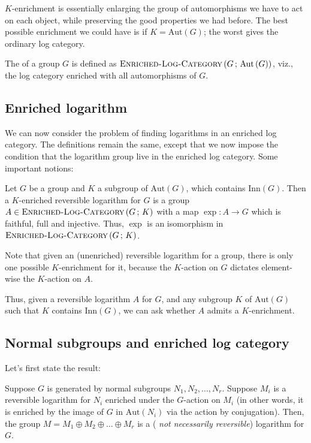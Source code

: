 \documentclass[a4paper]{amsart}
\newcommand{\enrichedlogcategory}[2]{\textsc{Enriched-Log-Category}\left(#1 \, ; \, #2\right)}
\newcommand{\aut}[1]{\text{Aut}\left(#1\right)}
\newcommand{\inn}[1]{\text{Inn}\left(#1\right)}
\begin{document}
$K$-enrichment is essentially enlarging the group of automorphisms we
have to act on each object, while preserving the good properties we
had before. The best possible enrichment we could have is if $K = \aut{G}$;
the worst gives the ordinary log category.

\begin{definer}
  The  of a group $G$ is
  defined as $\enrichedlogcategory{G}{\aut{G}}$, viz., the log
  category enriched with all automorphisms of $G$.
\end{definer}

\subsection{Enriched logarithm}

We can now consider the problem of finding logarithms in an enriched
log category. The definitions remain the same, except that we now
impose the condition that the logarithm group live in the enriched log
category. Some important notions:

\begin{definer}
  Let $G$ be a group and $K$ a subgroup of $\aut{G}$, which contains
  $\inn{G}$. Then a $K$-enriched reversible logarithm for $G$ is a
  group $A \in \enrichedlogcategory{G}{K}$ with a map $\exp:A \to G$
  which is faithful, full and injective. Thus, $\exp$ is an
  isomorphism in $\enrichedlogcategory{G}{K}$.
\end{definer}

Note that given an (unenriched) reversible logarithm for a group,
there is only one possible $K$-enrichment for it, because the
$K$-action on $G$ dictates element-wise the $K$-action on $A$.

Thus, given a reversible logarithm $A$ for $G$, and any subgroup $K$
of $\aut{G}$ such that $K$ contains $\inn{G}$, we can ask whether $A$
admits a $K$-enrichment.

\subsection{Normal subgroups and enriched log category}

Let's first state the result:

\begin{theorem}
  Suppose $G$ is generated by normal subgroups $N_1, N_2, \ldots,
  N_r$. Suppose $M_i$ is a reversible logarithm for $N_i$ enriched
  under the $G$-action on $M_i$ (in other words, it is enriched by the
  image of $G$ in $\aut{N_i}$ via the action by conjugation). Then,
  the group $M = M_1 \oplus M_2 \oplus \ldots \oplus M_r$ is a ({\em
    not necessarily reversible}) logarithm for $G$.
\end{theorem}
\end{document}

